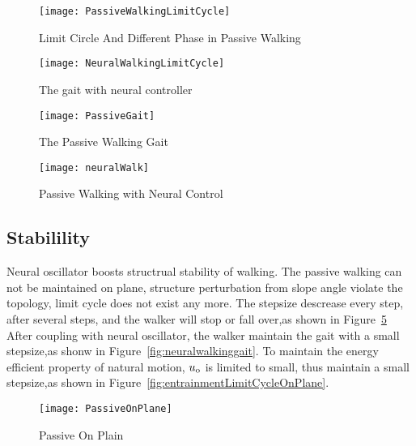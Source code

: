 \begin{figure}[!htbp]
  \begin{center}
    \texttt{[image: PassiveWalkingLimitCycle]}
    \caption{Limit Circle And Different Phase in Passive Walking}
    \label{fig:passivegaitlimitcycle}
\end{center}
\end{figure}


\begin{figure}[!htbp]
  \begin{center}
      \texttt{[image: NeuralWalkingLimitCycle]}
    \caption{The gait with neural controller}
    \label{fig:entrainmentgaitlimitcyle}
\end{center}
\end{figure}

\begin{figure}[!htbp]
  \begin{center}
     \texttt{[image: PassiveGait]}
    \caption{The Passive Walking Gait}
    \label{fig:passivegait}
\end{center}
\end{figure}

\begin{figure}[!htbp]
  \begin{center}
     \texttt{[image: neuralWalk]}
    \caption{Passive Walking with Neural Control}
    \label{fig:entrainmentgait}
\end{center}
\end{figure}

\subsection{Stabilility}

Neural oscillator  boosts structrual stability of walking. 
The passive walking can not be maintained on plane, structure perturbation from slope angle violate the topology, limit cycle does not exist any more.
The stepsize descrease every step, after several steps, and the walker will stop or fall over,as shown in Figure~\ref{fig:passivegaitplane}
After coupling with neural oscillator, the  walker maintain the gait with a small stepsize,as shonw in Figure~\ref{fig:neuralwalkinggait}.
To maintain the energy efficient property of natural motion, $u_{\mathrm{o}}$ is limited to small, thus maintain a small stepsize,as shown in Figure~\ref{fig:entrainmentLimitCycleOnPlane}.

\begin{figure}[!htbp]
  \begin{center}
    \texttt{[image: PassiveOnPlane]}
    \caption{Passive On Plain}
    \label{fig:passivegaitplane}
\end{center}
\end{figure}

